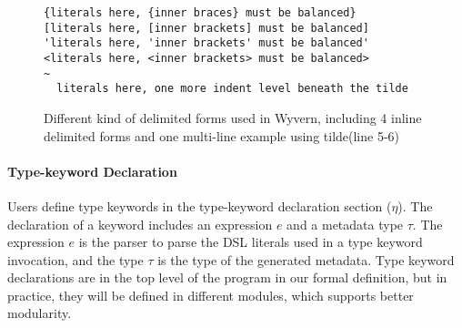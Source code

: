 \documentclass{sig-alternate}
\makeatletter
\newcommand\BeraMonottfamily{%
  \def\fvm@Scale{0.85}%
  \fontfamily{fvm}\selectfont%
}
\newcommand{\textcd}[1]{\textbf{\scriptsize\BeraMonottfamily{#1}}}
\newcommand{\mycaption}[1]{\vspace{-4px}\caption{#1}\vspace{-2px}}
\newcommand{\tabularspace}{~~~~~~}
\makeatother
\begin{document}
\begin{comment}
\tabularspace$l[\mathbf{val},\tau];\omega$                 & \textcd{val} $l$ : $\tau$\\
\tabularspace$l[\mathbf{def},\tau];\omega$                 & \textcd{def} $l$ : $\tau$\\
\multicolumn{3}{l}{Casetype Cases}\\
$\chi$~::=~$\emptyset$                      \\                 
\tabularspace$C[\tau];\chi$                   & $C$~\textcd{of}~$\tau$\\
\multicolumn{3}{l}{External Term}\\
 $e$~::=~...                              & \\
\tabularspace$\mathbf{lit}[body]$             & $delims$\\
\tabularspace$\mathbf{ekey}[k,body](e)$       & $e.k$ $delims$\\
\multicolumn{3}{l}{Translational Terms}\\
$\hat{e}$~::=~...                              & \\
\tabularspace$\mathbf{spliced}[e]$            & \\
\multicolumn{3}{l}{Internal Terms}\\
$i$~::=~...                                                     
\end{tabular}
\mycaption{Abstract and Concrete Forms}
\label{formal-syntax}
\end{figure}
\end{comment}

\begin{figure}[ht]
\begin{lstlisting}[style=tempwyvern]
{literals here, {inner braces} must be balanced}
[literals here, [inner brackets] must be balanced]
'literals here, 'inner brackets' must be balanced'
<literals here, <inner brackets> must be balanced>
~
  literals here, one more indent level beneath the tilde
\end{lstlisting}
\mycaption{Different kind of delimited forms used in Wyvern, including 4 inline delimited forms and one multi-line example using tilde(line 5-6)}
\label{f-delimited}
\end{figure}

\paragraph{Type-keyword Declaration}
Users define type keywords in the type-keyword declaration section ($\eta$). The declaration of a keyword includes an expression $e$ and a metadata type $\tau$. The expression $e$ is the parser to parse the DSL literals used in a type keyword invocation, and the type $\tau$ is the type of the generated metadata. Type keyword declarations are in the top level of the program in our formal definition, but in practice, they will be defined in different modules, which supports better modularity.
\end{document}
